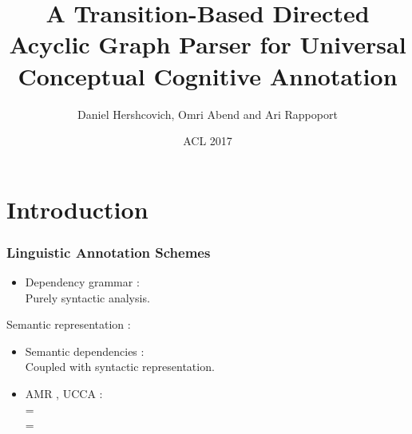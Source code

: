 \documentclass[t]{beamer}
\begin{document}
\title[A Transition-Based DAG Parser for UCCA]{A Transition-Based Directed Acyclic Graph Parser for Universal Conceptual Cognitive Annotation}
\author{Daniel Hershcovich, Omri Abend and Ari Rappoport}
\date{ACL 2017}

\begin{frame}
\titlepage
\end{frame}



\section{Introduction}

\begin{frame}
\linespread{1.5}
\frametitle{Linguistic Annotation Schemes}
\begin{itemize}
	\setlength{\itemindent}{-3em}
	\item Dependency grammar \cite{Tesn:59,nivre2005dependency}: \\
		Purely syntactic analysis.
\end{itemize}

Semantic representation \cite{abend2017the}:
\begin{itemize}
	\setlength{\itemindent}{-3em}
	\item Semantic dependencies \cite{oepen2015semeval}: \\
		Coupled with syntactic representation.
	\item AMR \cite{banarescu2013abstract}, UCCA \cite{abend2013universal}: \\
		 =  \\
		 = 
\end{itemize}
\end{frame}
\end{document}
